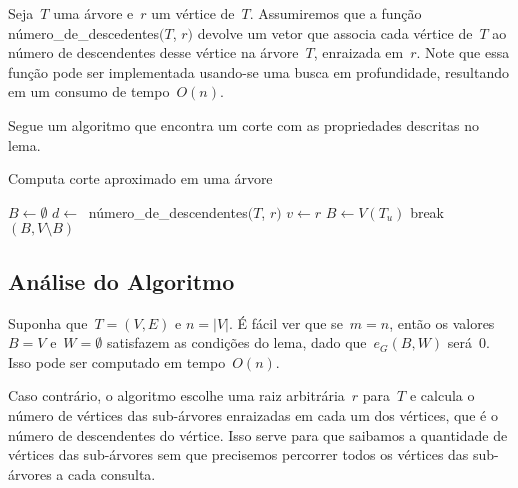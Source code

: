 \documentclass[a4paper,12pt]{article}
\begin{document}
\bigskip

Seja~$T$ uma árvore e~$r$ um vértice de~$T$. 
Assumiremos que
a função {\sc número\_de\_descedentes}$(T$, $r)$ devolve um vetor
que associa cada vértice de~$T$ ao número de descendentes desse 
vértice na árvore~$T$, enraizada em~$r$. Note que essa função 
pode ser implementada usando-se uma busca em profundidade,
resultando em um consumo de tempo~$O(n)$.


Segue um algoritmo que encontra um corte com as propriedades 
descritas no lema.

\medskip

\begin{algorithm}[H]
\label{alg:simpleApproxCutTree}

	\caption{Computa corte aproximado em uma árvore}
	$B \gets \emptyset$\;
	{
		$d \gets~$ {\sc número\_de\_descendentes}$(T$, $r)$\;
		$v \gets r$\;
		{
			$B\gets V(T_u)$\;  
		}
		{
		{
			{
				break\;
			}
		}
		}
	}
	\Return $(B,V\setminus B)$

\end{algorithm}	

\bigskip
\bigskip
\bigskip

\subsection*{Análise do Algoritmo}

	Suponha que~$T=(V,E)$ e $n=|V|$.
	É fácil ver que se~$m=n$, então os valores~$B =V$ 
	e~$W =\emptyset$ satisfazem as condições do lema, dado 
	que~$e_G(B,W)$ será~$0$. 
	Isso pode ser computado em tempo~$O(n)$.

	Caso contrário, o algoritmo escolhe uma raiz arbitrária~$r$ 
	para~$T$ e calcula o número de vértices das sub-árvores 
	enraizadas em cada um dos vértices, que é o número de 
	descendentes do vértice.
	Isso serve para que saibamos a quantidade de vértices das 
	sub-árvores sem que precisemos percorrer todos os vértices das 
	sub-árvores a cada consulta.
\end{document}
